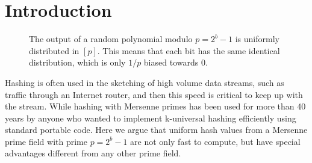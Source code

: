 \section{Introduction}

\begin{figure}
   \centering
   \caption{The output of a random polynomial modulo $p=2^b-1$ is uniformly distributed in $[p]$. This means that each bit has the same identical distribution, which is only $1/p$ biased towards 0.}
   \label{fig:bits}
\end{figure}

Hashing is often used in the sketching of high volume data streams, such as traffic through an Internet router, and then this speed is critical to keep up with the stream.
%
%
While hashing with Mersenne primes has been used for more than 40 years by anyone who
wanted to implement k-universal hashing efficiently using standard portable code.
Here we argue that uniform hash values from a Mersenne prime field with prime $p=2^b-1$
are not only fast to compute,
but have special advantages different from any other prime field.

